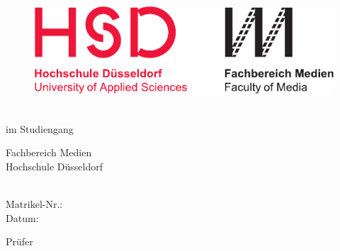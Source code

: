 \thispagestyle{empty}

\begin{figure}
  \flushleft %
  \includegraphics[width=.5\textwidth]{figures/hsd_m_logo.pdf}
\end{figure}

\vspace*{12ex}

\hfill
\begin{minipage}{.8\textwidth}
  \begin{flushright}
    
    {\Huge\bfseries\DocumentThesisTitle\par}
    
    \vspace*{2ex}		
    
    {\large\DocumentThesisSubtitle}
    
    \vspace*{12ex}
    
    \onehalfspacing
    
    \textbf{\DocumentThesisType}\\
    \vspace*{1ex}
    im Studiengang \DocumentThesisCourse\\
    
    \vspace*{8ex}
    
    Fachbereich Medien\\
    Hochschule Düsseldorf
    
    \vspace*{12ex}
    
    \DocumentAuthorPrename\ \DocumentAuthorName\\
    Matrikel-Nr.: \DocumentThesisMatr\\
    Datum: \DocumentThesisDateCover
    
    \vspace*{12ex}
    
    Prüfer\\
    \vspace*{1ex}
    \DocumentThesisFirstExaminer

  \end{flushright}
\end{minipage}